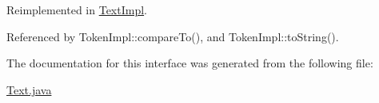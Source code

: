 Reimplemented in \hyperlink{classTextImpl_a0}{Text\-Impl}.

Referenced by Token\-Impl::compare\-To(), and Token\-Impl::to\-String().



The documentation for this interface was generated from the following file:\begin{CompactItemize}
\item 
\hyperlink{Text_8java-source}{Text.java}\end{CompactItemize}
